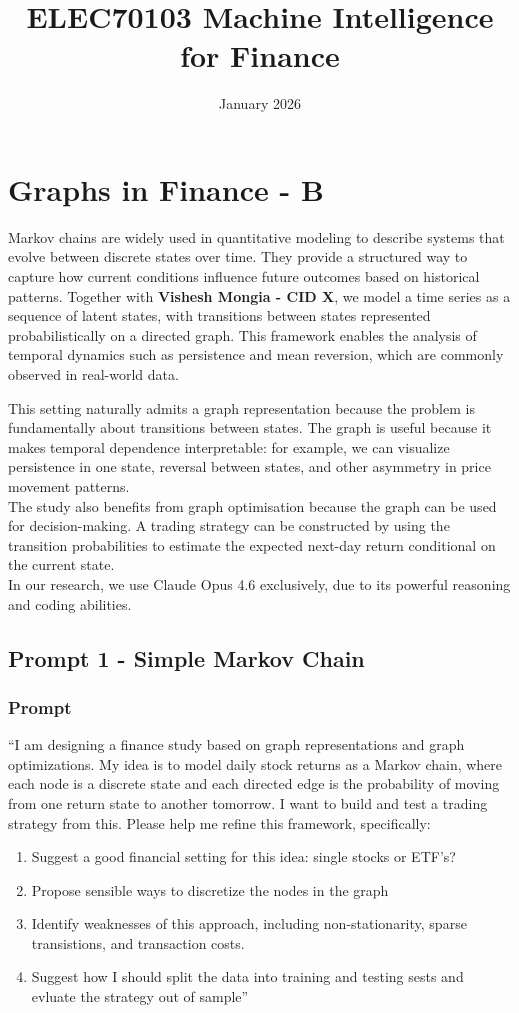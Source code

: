 \documentclass{article}
\title{ELEC70103 Machine Intelligence for Finance}
\date{January 2026}
\begin{document}
\clearpage
\section{Graphs in Finance - B}

Markov chains are widely used in quantitative modeling to describe systems that evolve between discrete states over time. They provide a structured way to capture how current conditions influence future outcomes based on historical patterns. Together with \textbf{Vishesh Mongia - CID X}, we model a time series as a sequence of latent states, with transitions between states represented probabilistically on a directed graph. This framework enables the analysis of temporal dynamics such as persistence and mean reversion, which are commonly observed in real-world data.

This setting naturally admits a graph representation because the problem is fundamentally about transitions between states. The graph is useful because it makes temporal dependence interpretable: for example, we can visualize persistence in one state, reversal between states, and other asymmetry in price movement patterns. \\ 

The study also benefits from graph optimisation because the graph can be used for decision-making. A trading strategy can be constructed by using the transition probabilities to estimate the expected next-day return conditional on the current state.\\

In our research, we use Claude Opus 4.6 exclusively, due to its powerful reasoning and coding abilities.

\subsection{Prompt 1 - Simple Markov Chain}
\subsubsection{Prompt}
``I am designing a finance study based on graph representations and graph optimizations. My idea is to model daily stock returns as a Markov chain, where each node is a discrete state and each directed edge is the probability of moving from one return state to another tomorrow. I want to build and test a trading strategy from this.  Please help me refine this framework, specifically:

\begin{enumerate}
    \item Suggest a good financial setting for this idea: single stocks or ETF's?
    \item Propose sensible ways to discretize the nodes in the graph
    \item Identify weaknesses of this approach, including non-stationarity, sparse transistions, and transaction costs. 
    \item Suggest how I should split the data into training and testing sests and evluate the strategy out of sample''
\end{enumerate}
\end{document}
